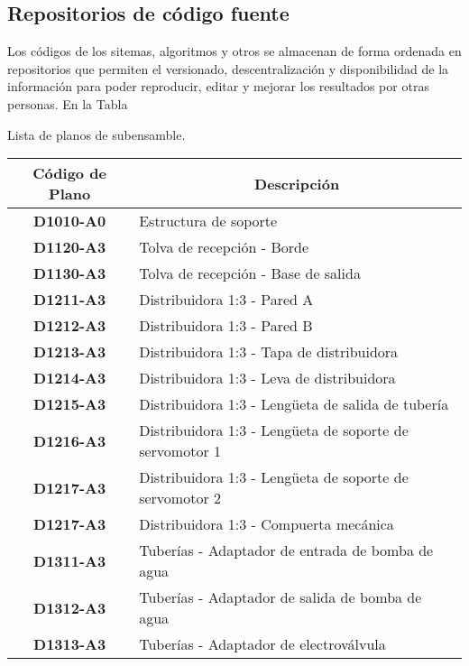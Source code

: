 \subsection{Repositorios de código fuente}

Los códigos de los sitemas, algoritmos y otros se almacenan de forma ordenada en repositorios que permiten el versionado, descentralización y disponibilidad de la información para poder reproducir, editar y mejorar los resultados por otras personas. En la Tabla

\begin{mytable}[H]
	\footnotesize\centering
	\caption{Lista de planos de subensamble.}
	\label{tab:lista de planos de subensamble}
	\begin{tabular}{|c|l|}
		\hline
		\multicolumn{1}{|c|}{\textbf{Código de Plano}} & \multicolumn{1}{c|}{\textbf{Descripción}} \\ \hline
		\textbf{D1010-A0}         & Estructura de soporte  \\ \hline
		\textbf{D1120-A3}         & Tolva de recepción - Borde \\ \hline
		\textbf{D1130-A3}         & Tolva de recepción - Base de salida \\ \hline
		\textbf{D1211-A3}         & Distribuidora 1:3 - Pared A \\ \hline
		\textbf{D1212-A3}         & Distribuidora 1:3 - Pared B \\ \hline
		\textbf{D1213-A3}         & Distribuidora 1:3 - Tapa de distribuidora \\ \hline
		\textbf{D1214-A3}         & Distribuidora 1:3 - Leva de distribuidora \\ \hline
		\textbf{D1215-A3}         & Distribuidora 1:3 - Lengüeta de salida de tubería \\ \hline
		\textbf{D1216-A3}         & Distribuidora 1:3 - Lengüeta de soporte de servomotor 1 \\ \hline
		\textbf{D1217-A3}         & Distribuidora 1:3 - Lengüeta de soporte de servomotor 2 \\ \hline 
		\textbf{D1217-A3}         & Distribuidora 1:3 - Compuerta mecánica \\ \hline 
		\textbf{D1311-A3}         & Tuberías - Adaptador de entrada de bomba de agua \\ \hline 
		\textbf{D1312-A3}         & Tuberías - Adaptador de salida de bomba de agua \\ \hline 
		\textbf{D1313-A3}         & Tuberías - Adaptador de electroválvula\\ \hline

\end{tabular}
\end{mytable}
